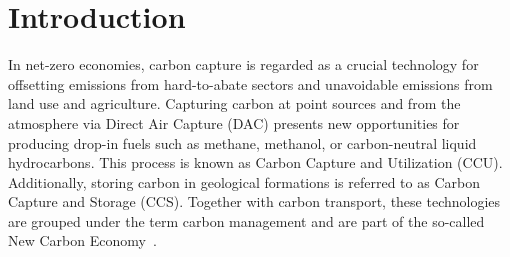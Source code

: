 \documentclass[twocolumn]{article}
\newcommand{\carbon}{CO$_2$}
\begin{document}
\begin{abstract}

\end{abstract}




\section{Introduction}
\label{sec:introduction}

In net-zero economies, carbon capture is regarded as a crucial technology for offsetting emissions from hard-to-abate sectors and unavoidable emissions from land use and agriculture. Capturing carbon at point sources and from the atmosphere via Direct Air Capture (DAC) presents new opportunities for producing drop-in fuels such as methane, methanol, or carbon-neutral liquid hydrocarbons. This process is known as Carbon Capture and Utilization (CCU). Additionally, storing carbon in geological formations is referred to as Carbon Capture and Storage (CCS). Together with carbon transport, these technologies are grouped under the term carbon management and are part of the so-called New Carbon Economy~\cite{arniehellerNewCarbonEconomy2019}.
\end{document}
